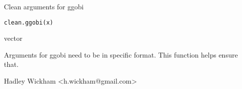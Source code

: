 \begin{Description}\relax
Clean arguments for ggobi
\end{Description}
\begin{Usage}
\begin{verbatim}clean.ggobi(x)\end{verbatim}
\end{Usage}
\begin{Arguments}
\begin{ldescription}
\item[\code{x}] vector
\end{ldescription}
\end{Arguments}
\begin{Details}\relax
Arguments for ggobi need to be in specific format.
This function helps ensure that.
\end{Details}
\begin{Author}\relax
Hadley Wickham <h.wickham@gmail.com>
\end{Author}
\begin{Examples}
\begin{ExampleCode}\end{ExampleCode}
\end{Examples}

